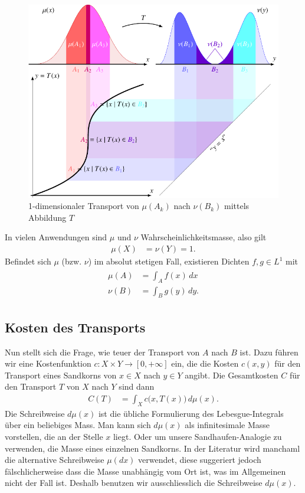 \begin{figure}
\centering
\includegraphics{papers/mongekant/images/t}
\caption{1-dimensionaler Transport von $\mu(A_k)$ nach $\nu(B_k)$ mittels Abbildung $T$}
\label{mongekant:fig:optimal_transport}
\end{figure}

In vielen Anwendungen sind $\mu$ und $\nu$ Wahrscheinlichkeitsmasse,
also gilt
\begin{align*}
\mu(X)
&=
\nu(Y)
=
1
.
\end{align*}
Befindet sich $\mu$ (bzw. $\nu$) im absolut stetigen Fall,
existieren Dichten $f,g\in L^{1}$ mit
\begin{align}
\begin{aligned}
\mu(A)
&=
\int_A f(x) \, dx
\\
\nu(B)
&=
\int_B g(y) \, dy
.
\end{aligned}
\label{mongekant:eq:absolute_continuity}
\end{align}

\subsection{Kosten des Transports\label{mongekant:subsection:transport_cost}}
Nun stellt sich die Frage,
wie \glqq teuer\grqq{} der Transport von $A$ nach $B$ ist.
Dazu führen wir eine Kostenfunktion $c : X \times Y \to [0, +\infty]$ ein,
die die Kosten $c(x,y)$ für den Transport eines Sandkorns
von $x \in X$ nach $y \in Y$ angibt.
Die Gesamtkosten $C$ für den Transport $T$ von $X$ nach $Y$ sind dann
\begin{align}
C(T)
&=
\int_X c\bigl(x, T(x)\bigr) \, d\mu(x)
\label{mongekant:eq:monge_transport_cost}
.
\end{align}
Die Schreibweise $d\mu(x)$ ist die übliche Formulierung des
Lebesgue-Integrals über ein beliebiges Mass.
Man kann sich $d\mu(x)$ als \glqq infinitesimale Masse\grqq{} vorstellen,
die an der Stelle $x$ liegt.
Oder um unsere Sandhaufen-Analogie zu verwenden,
die Masse eines einzelnen Sandkorns.
In der Literatur wird manchaml die alternative Schreibweise $\mu(dx)$ verwendet,
diese suggeriert jedoch fälschlicherweise dass die Masse unabhängig vom Ort ist,
was im Allgemeinen nicht der Fall ist.
Deshalb benutzen wir ausschliesslich die Schreibweise $d\mu(x)$.
